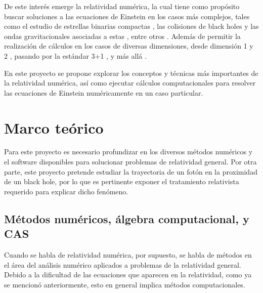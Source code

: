 \documentclass[%
 reprint,
 amsmath,amssymb,
 aps,
floatfix,
]{revtex4-1}
\begin{document}
De este interés emerge la relatividad numérica, la cual tiene como propósito buscar soluciones a las ecuaciones de Einstein en los casos más complejos, tales como el estudio de estrellas binarias compactas \cite{Baumgarte2003NumericalBinaries}, las colisiones de black holes y las ondas gravitacionales asociadas a estas \cite{Centrella2010Black-holeRelativity, Nakamura1993GravitationalRelativity}, entre otros \cite{Cardoso2015ExploringRelativity, Lehner2001NumericalReview, Lehner2014SummaryApplications, Shibata2004StatusRelativity, Piran1981PROBLEMSRELATIVITY}. Además de permitir la realización de cálculos en los casos de diversas dimensiones, desde dimensión 1 \cite{Arbona1999DealingRelativity, Gourgoulhon19921DCollapse} y 2 \cite{Font1993NumericalRelativity}, pasando por la estándar 3+1 \cite{Alcubierre2008IntroductionRelativity, Brugmann2000NumericalDimensions}, y más allá \cite{Witek2013NumericalSpace-times}.

En este proyecto se propone explorar los conceptos y técnicas más importantes de la relatividad numérica, así como ejecutar cálculos computacionales para resolver las ecuaciones de Einstein numéricamente en un caso particular.

\section{Marco teórico}

Para este proyecto es necesario profundizar en los diversos métodos numéricos y el software disponibles para solucionar problemas de relatividad general. Por otra parte, este proyecto pretende estudiar la trayectoria de un fotón en la proximidad de un black hole, por lo que es pertinente exponer el tratamiento relativista requerido para explicar dicho fenómeno.

\subsection{Métodos numéricos, álgebra computacional, y CAS}

Cuando se habla de relatividad numérica, por supuesto, se habla de métodos en el área del análisis numérico aplicados a problemas de la relatividad general. Debido a la dificultad de las ecuaciones que aparecen en la relatividad, como ya se mencionó anteriormente, esto en general implica métodos computacionales.
\end{document}
